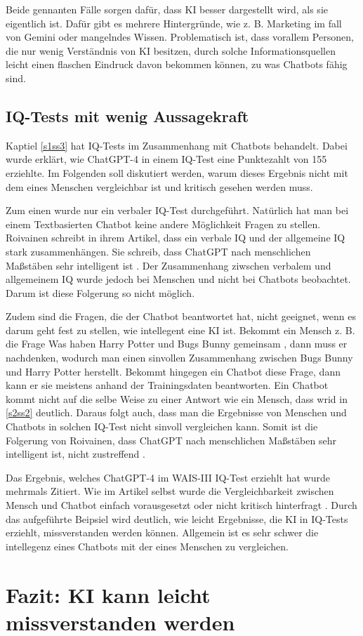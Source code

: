 	Beide gennanten Fälle sorgen dafür, dass KI besser dargestellt wird, als sie eigentlich
	ist. Dafür gibt es mehrere Hintergründe, wie z. B. Marketing im fall von Gemini oder mangelndes
	Wissen. Problematisch ist, dass vorallem Personen, die nur wenig Verständnis von KI besitzen, durch 
	solche Informationsquellen leicht einen flaschen Eindruck davon bekommen können, zu was Chatbots fähig sind.
	
	
	\subsection{IQ-Tests mit wenig Aussagekraft}\label{s3ss1}
	Kaptiel \ref{s1ss3} hat IQ-Tests im Zusammenhang mit Chatbots behandelt. Dabei wurde erklärt, wie ChatGPT-4 in einem
	IQ-Test eine Punktezahlt von 155 erziehlte. Im Folgenden soll diskutiert werden, warum dieses Ergebnis nicht mit dem
	eines Menschen vergleichbar ist und kritisch gesehen werden muss.
	
	Zum einen wurde nur ein verbaler IQ-Test durchgeführt. Natürlich hat man bei einem Textbasierten Chatbot 
	keine andere Möglichkeit Fragen zu stellen. Roivainen schreibt in ihrem Artikel, dass ein verbale IQ und der allgemeine IQ
	stark zusammenhängen. Sie schreib, dass ChatGPT nach menschlichen Maßstäben sehr intelligent ist \cite{roivainen23}.
	Der Zusammenhang ziwschen verbalem und allgemeinem IQ wurde jedoch bei Menschen und nicht bei Chatbots beobachtet. Darum
	ist diese Folgerung so nicht möglich.
	
	Zudem sind die Fragen, die der Chatbot beantwortet hat, nicht geeignet, wenn es darum geht fest zu stellen, wie intellegent eine KI ist.
	Bekommt ein Mensch z. B. die Frage \glqq{}Was haben Harry Potter und Bugs Bunny gemeinsam\grqq{} \cite{roivainen23},
	dann muss er nachdenken, wodurch man einen sinvollen Zusammenhang zwischen Bugs Bunny und Harry Potter herstellt.
	Bekommt hingegen ein Chatbot diese Frage, dann kann er sie meistens anhand der Trainingsdaten beantworten. Ein Chatbot
	kommt nicht auf die selbe Weise zu einer Antwort wie ein Mensch, dass wrid in \ref{s2ss2} deutlich. Daraus folgt auch,
	dass man die Ergebnisse von Menschen und Chatbots in solchen IQ-Test nicht sinvoll vergleichen kann. Somit ist die
	Folgerung von Roivainen, dass ChatGPT nach menschlichen Maßstäben sehr intelligent ist, nicht zustreffend \cite{roivainen23}. 
	
	Das Ergebnis, welches ChatGPT-4 im WAIS-III IQ-Test erziehlt hat wurde mehrmals Zitiert. Wie im Artikel selbst wurde die
	Vergleichbarkeit zwischen Mensch und Chatbot einfach vorausgesetzt \cite{gawdat23} oder nicht kritisch hinterfragt 
	\cite{blutermann23}. Durch das aufgeführte Beipsiel wird deutlich, wie leicht Ergebnisse, die KI in IQ-Tests erziehlt, missverstanden
	werden können. Allgemein ist es sehr schwer die intellegenz eines Chatbots mit der eines Menschen zu vergleichen. 
\section{Fazit: KI kann leicht missverstanden werden}\label{s4}